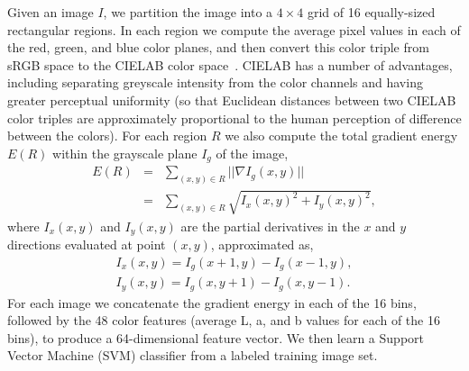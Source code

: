 \newcommand{\lab}{CIELAB }
Given an image $I$, we partition the image into a $4 \times 4$ grid of
16 equally-sized rectangular regions. In each region we compute the
average pixel values in each of the red, green, and blue color planes,
and then convert this color triple from sRGB space to the \lab color
space~\cite{lab}. \lab  has a number of advantages, including
separating greyscale intensity from the color channels and having greater
perceptual uniformity (so that Euclidean distances between two \lab
color triples are approximately proportional to the human perception
of difference between the colors). For each region $R$ we also compute the
total gradient energy $E(R)$ within the grayscale plane $I_g$ of the image,
%
\begin{eqnarray*}
E(R) & = & \sum_{(x,y) \in R}   || \nabla I_g(x,y) || \\
& = & \sum_{(x,y) \in R} \sqrt{I_x(x,y)^2 + I_y(x,y)^2}, 
\end{eqnarray*}
%
where $I_x(x,y)$ and $I_y(x,y)$ are the partial derivatives in the $x$
and $y$ directions evaluated at point $(x,y)$, approximated as,
%
\begin{eqnarray*}
I_x(x,y) = I_g(x+1, y) - I_g(x-1, y), \\
 I_y(x,y) = I_g(x, y+1) - I_g(x, y-1).
\end{eqnarray*}
%
  For each image we
concatenate the gradient energy in each of the 16 bins, followed by
the 48 color features (average L, a, and b values for each of the 16
bins), to produce a 64-dimensional feature vector.  We then learn a
Support Vector Machine (SVM) classifier from a labeled training image
set.
